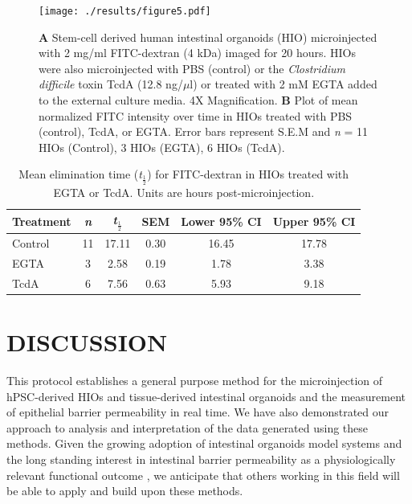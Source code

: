 \documentclass[11pt]{article}
\begin{document}
\begin{figure}[h]
\texttt{[image: ./results/figure5.pdf]}
\caption{\textbf{A} Stem-cell derived human intestinal organoids (HIO) microinjected with 2 mg/ml FITC-dextran (4 kDa) imaged for 20 hours. HIOs were also microinjected with PBS (control) or the \textit{Clostridium difficile} toxin TcdA (12.8 ng/$\mu$l) or treated with 2 mM EGTA added to the external culture media. 4X Magnification. \textbf{B} Plot of mean normalized FITC intensity over time in HIOs treated with PBS (control), TcdA, or EGTA. Error bars represent S.E.M and \textit{n} = 11 HIOs (Control), 3 HIOs (EGTA), 6 HIOs (TcdA).}
\end{figure}

\begin{table}[ht]
\centering
\begin{tabular}{l|ccccc}
{\bf Treatment} & {\bf \textit{n}} & {\bf \textit{t}$_\frac{1}{2}$} & {\bf SEM} & {\bf Lower 95\% CI} & {\bf Upper 95\% CI} \\ 
\hline
Control &  11 & 17.11  & 0.30 & 16.45 & 17.78 \\ 
EGTA  &   3 & 2.58 & 0.19 & 1.78 & 3.38 \\ 
TcdA &   6 & 7.56  & 0.63 & 5.93 & 9.18 \\ 
\end{tabular}
\caption{Mean elimination time (\textit{t}$_\frac{1}{2}$) for FITC-dextran in HIOs treated with EGTA or TcdA. Units are hours post-microinjection.}
\end{table}


\section*{DISCUSSION}
This protocol establishes a general purpose method for the microinjection of hPSC-derived HIOs and tissue-derived intestinal organoids and the measurement of epithelial barrier permeability in real time. We have also demonstrated our approach to analysis and interpretation of the data generated using these methods. Given the growing adoption of intestinal organoids model systems \supercite{Clevers:2016,Hill:2017,Aurora:2016,Dedhia:2016} and the long standing interest in intestinal barrier permeability as a physiologically relevant functional outcome \supercite{Clayburgh:2004,Turner:2009,Bischoff:2014,Odenwald:2017}, we anticipate that others working in this field will be able to apply and build upon these methods.\\
\end{document}
